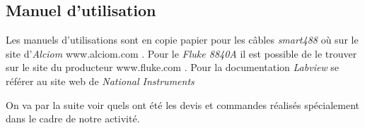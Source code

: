 \subsection{Manuel d'utilisation}
Les manuels d'utilisations sont en copie papier pour les câbles \emph{smart488} où sur le site d'\emph{Alciom} www.alciom.com . Pour le \emph{Fluke 8840A} il est possible de le trouver sur le site du producteur www.fluke.com . Pour la documentation \emph{Labview} se référer au site web de \emph{National Instruments}

On va par la suite voir quels ont été les devis et commandes réalisés spécialement dans le cadre de notre activité.
